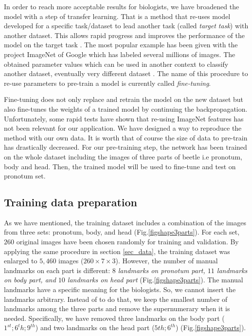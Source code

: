 \documentclass[10pt]{article}
\begin{document}
In order to reach more acceptable results for biologists, we have
broadened the model with a step of transfer learning. That is a
method that re-uses model developed for a specific task/dataset
to lead another task (called \textit{target task}) with another dataset. This allows rapid progress and improves the performance of the model on the target task \cite{torrey2009transfer}. The most popular
example has been given with the project ImageNet of Google \cite{imagenet_cvpr09} which has labeled several millions of images. The obtained parameter values which can
be used in another context to classify another dataset, eventually
very different dataset \cite{margeta_mri}. The name of this procedure to re-use parameters
to pre-train a model is currently called \textit{fine-tuning}.

Fine-tuning does not only replace and retrain the model on the new
dataset but also fine-tunes the weights of a trained model by continuing the
backpropagation. Unfortunately, some rapid tests have shown that
re-using ImageNet features has not been relevant for our
application. We have designed a way to reproduce the method with our
own data. It is worth that of course the size of data to pre-train has drastically decreased. For our pre-training step, the network has been trained on the whole dataset including the images of three parts of beetle i.e pronotum, body and head. Then,
the trained model will be used to fine-tune and test on pronotum set.


\subsection{Training data preparation}
As we have mentioned, the training dataset includes a combination of the images from three
sets: pronotum, body, and head (Fig.\ref{figshape3parts}). For each
set, $260$ original images have been chosen randomly for training and
validation. By applying the same procedure in section \ref{sec_data},
the training dataset was enlarged to $5,460$ images ($260 \times 7
\times 3$). However, the number of manual landmarks on each part is
different: \textit{$8$ landmarks on pronotum part, $11$ landmarks on
  body part, and $10$ landmarks on head part} (Fig.\ref{figshape3parts}). The manual landmarks
have a specific meaning for the biologists. So, we cannot insert the
landmarks arbitrary. Instead of to do that, we keep the smallest number of
landmarks among the three parts and remove the supernumerary when it is needed. Specifically, we have removed three landmarks on the body part
($1^{st}; 6^{t}h; 9^{th}$) and two landmarks on the head part ($5{th};
6^{th}$) (Fig.\ref{figshape3parts}).
\end{document}

